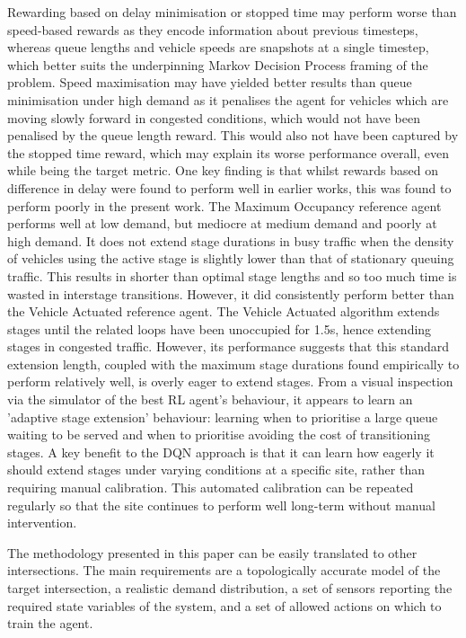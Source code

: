 \documentclass[conference]{IEEEtran}
\begin{document}
Rewarding based on delay minimisation or stopped time may perform worse than speed-based rewards as they encode information about previous timesteps, whereas queue lengths and vehicle speeds are snapshots at a single timestep, which better suits the underpinning Markov Decision Process framing of the problem.
Speed maximisation may have yielded better results than queue minimisation under high demand as it penalises the agent for vehicles which are moving slowly forward in congested conditions, which would not have been penalised by the queue length reward.
This would also not have been captured by the stopped time reward, which may explain its worse performance overall, even while being the target metric. One key finding is that whilst rewards based on difference in delay were found to perform well in earlier works, this was found to perform poorly in the present work.
The Maximum Occupancy reference agent performs well at low demand, but mediocre at medium demand and poorly at high demand.
It does not extend stage durations in busy traffic when the density of vehicles using the active stage is slightly lower than that of stationary queuing traffic.
This results in shorter than optimal stage lengths and so too much time is wasted in interstage transitions.
However, it did consistently perform better than the Vehicle Actuated reference agent.
The Vehicle Actuated algorithm extends stages until the related loops have been unoccupied for 1.5s, hence extending stages in congested traffic.
However, its performance suggests that this standard extension length, coupled with the maximum stage durations found empirically to perform relatively well, is overly eager to extend stages.
From a visual inspection via the simulator of the best RL agent's behaviour, it appears to learn an 'adaptive stage extension' behaviour: learning when to prioritise a large queue waiting to be served and when to prioritise avoiding the cost of transitioning stages.
A key benefit to the DQN approach is that it can learn how eagerly it should extend stages under varying conditions at a specific site, rather than requiring manual calibration.
This automated calibration can be repeated regularly so that the site continues to perform well long-term without manual intervention.

The methodology presented in this paper can be easily translated to other intersections.
The main requirements are a topologically accurate model of the target intersection, a realistic demand distribution, a set of sensors reporting the required state variables of the system, and a set of allowed actions on which to train the agent.
\end{document}
